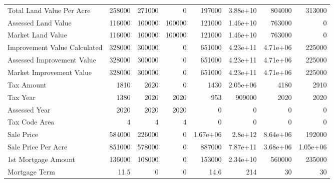 \begin{tabular}{lrrrrrrr}
 Total Land Value Per Acre      & 258000        & 271000        &      0        & 197000        &      3.88e+10 & 804000        & 313000        \\
 Assessed Land Value            & 116000        & 100000        & 100000        & 121000        &      1.46e+10 & 763000        &      0        \\
 Market Land Value              & 116000        & 100000        & 100000        & 121000        &      1.46e+10 & 763000        &      0        \\
 Improvement Value Calculated   & 328000        & 300000        &      0        & 651000        &      4.23e+11 &      4.71e+06 & 225000        \\
 Assessed Improvement Value     & 328000        & 300000        &      0        & 651000        &      4.23e+11 &      4.71e+06 & 225000        \\
 Market Improvement Value       & 328000        & 300000        &      0        & 651000        &      4.23e+11 &      4.71e+06 & 225000        \\
 Tax Amount                     &   1810        &   2620        &      0        &   1430        &      2.05e+06 &   4180        &   2910        \\
 Tax Year                       &   1380        &   2020        &   2020        &    953        & 909000        &   2020        &   2020        \\
 Assessed Year                  &   2020        &   2020        &   2020        &      0        &      0        &      0        &      0        \\
 Tax Code Area                  &      4        &      4        &      4        &      0        &      0        &      0        &      0        \\
 Sale Price                     & 584000        & 226000        &      0        &      1.67e+06 &      2.8e+12  &      8.64e+06 & 192000        \\
 Sale Price Per Acre            & 851000        & 578000        &      0        & 887000        &      7.87e+11 &      3.68e+06 &      1.05e+06 \\
 1st Mortgage Amount            & 136000        & 108000        &      0        & 153000        &      2.34e+10 & 560000        & 235000        \\
 Mortgage Term                  &     11.5      &      0        &      0        &     14.6      &    214        &     30        &     30        \\

\end{tabular}
